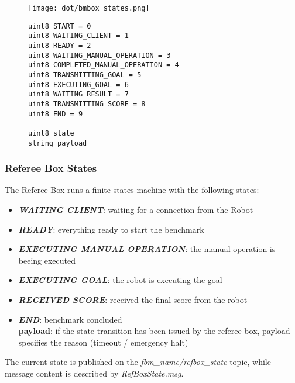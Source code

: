 \documentclass[a4paper]{article}
\begin{document}
\begin{figure}[h!]
  \begin{center}
    \texttt{[image: dot/bmbox\_states.png]}
  \end{center}
\end{figure}

\begin{figure}[h!]
	\noindent
	\begin{minipage}[t!]{\linewidth}
		\begin{lstlisting}[caption=BmBoxState.msg]
uint8 START = 0
uint8 WAITING_CLIENT = 1
uint8 READY = 2
uint8 WAITING_MANUAL_OPERATION = 3
uint8 COMPLETED_MANUAL_OPERATION = 4
uint8 TRANSMITTING_GOAL = 5
uint8 EXECUTING_GOAL = 6
uint8 WAITING_RESULT = 7
uint8 TRANSMITTING_SCORE = 8
uint8 END = 9

uint8 state
string payload
		\end{lstlisting}
	\end{minipage}
\end{figure}

\clearpage

\subsubsection{Referee Box States}

The Referee Box runs a finite states machine with the following states:
\begin{itemize}
  \item \textbf{\emph{WAITING CLIENT}}: waiting for a connection from the Robot
  \item \textbf{\emph{READY}}: everything ready to start the benchmark
  \item \textbf{\emph{EXECUTING MANUAL OPERATION}}: the manual operation is beeing executed
  \item \textbf{\emph{EXECUTING GOAL}}: the robot is executing the goal
  \item \textbf{\emph{RECEIVED SCORE}}: received the final score from the robot
  \item \textbf{\emph{END}}: benchmark concluded\\
    \textbf{payload}: if the state transition has been issued by the referee box, payload specifies the reason (timeout / emergency halt)
\end{itemize}

The current state is published on the \emph{fbm\_name/refbox\_state} topic, while message content is described by \emph{RefBoxState.msg}.
\end{document}
